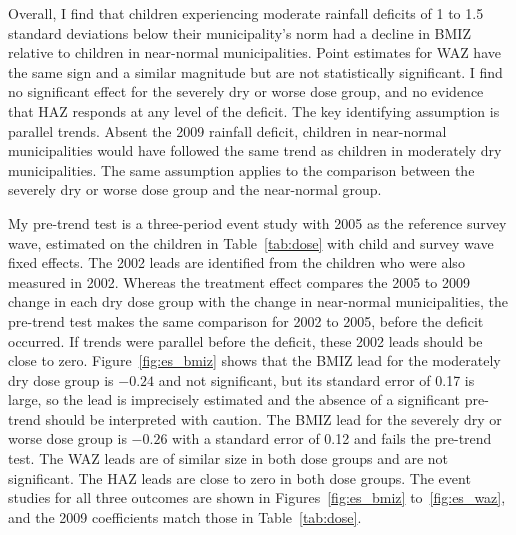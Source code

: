 Overall, I find that children experiencing moderate rainfall deficits of 1 to 1.5 standard deviations below their municipality's norm had a decline in BMIZ relative to children in near-normal municipalities. Point estimates for WAZ have the same sign and a similar magnitude but are not statistically significant. I find no significant effect for the severely dry or worse dose group, and no evidence that HAZ responds at any level of the deficit. The key identifying assumption is parallel trends. Absent the 2009 rainfall deficit, children in near-normal municipalities would have followed the same trend as children in moderately dry municipalities. The same assumption applies to the comparison between the severely dry or worse dose group and the near-normal group.

My pre-trend test is a three-period event study with 2005 as the reference survey wave, estimated on the children in Table~\ref{tab:dose} with child and survey wave fixed effects. The 2002 leads are identified from the children who were also measured in 2002. Whereas the treatment effect compares the 2005 to 2009 change in each dry dose group with the change in near-normal municipalities, the pre-trend test makes the same comparison for 2002 to 2005, before the deficit occurred. If trends were parallel before the deficit, these 2002 leads should be close to zero. Figure~\ref{fig:es_bmiz} shows that the BMIZ lead for the moderately dry dose group is $-0.24$ and not significant, but its standard error of 0.17 is large, so the lead is imprecisely estimated and the absence of a significant pre-trend should be interpreted with caution. The BMIZ lead for the severely dry or worse dose group is $-0.26$ with a standard error of 0.12 and fails the pre-trend test. The WAZ leads are of similar size in both dose groups and are not significant. The HAZ leads are close to zero in both dose groups. The event studies for all three outcomes are shown in Figures~\ref{fig:es_bmiz} to~\ref{fig:es_waz}, and the 2009 coefficients match those in Table~\ref{tab:dose}.


